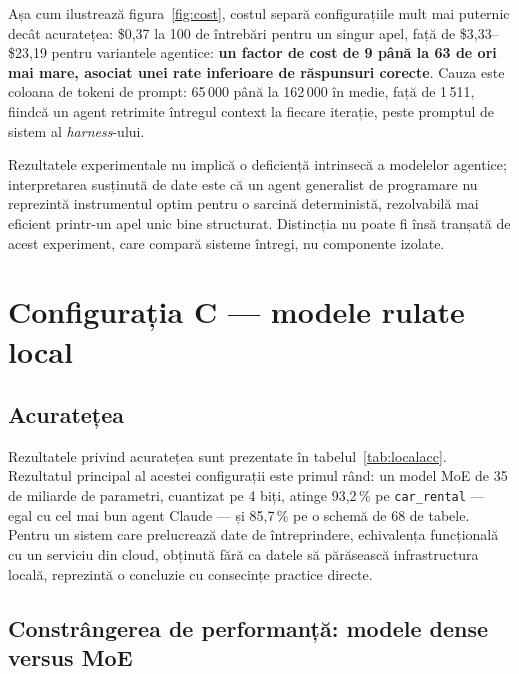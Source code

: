 \documentclass[12pt,a4paper]{report}
\newcommand{\code}[1]{\texttt{\small #1}}
\begin{document}
Așa cum ilustrează figura~\ref{fig:cost}, costul separă configurațiile mult mai puternic decât acuratețea: \$0,37 la
100 de întrebări pentru un singur apel, față de \$3,33--\$23,19 pentru
variantele agentice: \textbf{un factor de cost de 9 până la 63 de ori mai mare, asociat
unei rate inferioare de răspunsuri corecte}. Cauza este coloana de tokeni de prompt: 65\,000
până la 162\,000 în medie, față de 1\,511, fiindcă un agent retrimite
întregul context la fiecare iterație, peste promptul de sistem al \emph{harness}-ului.

Rezultatele experimentale nu implică o deficiență intrinsecă a modelelor agentice;
interpretarea susținută de date este că un agent generalist de programare
nu reprezintă instrumentul optim pentru o sarcină deterministă, rezolvabilă
mai eficient printr-un apel unic bine structurat. Distincția nu poate fi însă tranșată de acest experiment, care
compară sisteme întregi, nu componente izolate.

\section{Configurația C --- modele rulate local}
\label{sec:config_c}

\subsection{Acuratețea}

\begin{table}[H]
\centering
\caption{Configurația C: modele rulate local. Coloanele de eșecuri se
raportează la cele 44 de întrebări punctate.}
\label{tab:localacc}
\footnotesize

\end{table}

Rezultatele privind acuratețea sunt prezentate în tabelul~\ref{tab:localacc}.
Rezultatul principal al acestei configurații este primul rând: un model MoE de 35 de
miliarde de parametri, cuantizat pe 4 biți, atinge 93,2\,\% pe
\code{car\_rental} --- egal cu cel mai bun agent Claude --- și 85,7\,\% pe o
schemă de 68 de tabele. Pentru un sistem care prelucrează date de
întreprindere, echivalența funcțională cu un serviciu din cloud, obținută
fără ca datele să părăsească infrastructura locală, reprezintă o concluzie cu consecințe practice
directe.

\subsection{Constrângerea de performanță: modele dense versus MoE}
\end{document}
